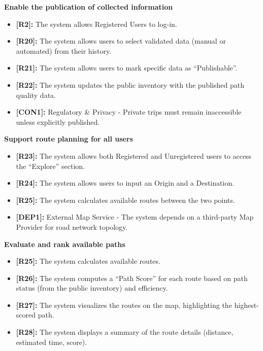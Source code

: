 \begin{enumerate}[label=\textbf{-[G\arabic*]}:]
    \item \textbf{Enable the publication of collected information}
    \begin{itemize}
        \item \textbf{[R2]:} The system allows Registered Users to log-in.
        \item \textbf{[R20]:} The system allows users to select validated data (manual or automated) from their history.
        \item \textbf{[R21]:} The system allows users to mark specific data as ``Publishable''.
        \item \textbf{[R22]:} The system updates the public inventory with the published path quality data.
        \item \textbf{[CON1]:} Regulatory \& Privacy - Private trips must remain inaccessible unless explicitly published.
    \end{itemize}

    \item \textbf{Support route planning for all users}
    \begin{itemize}
        \item \textbf{[R23]:} The system allows both Registered and Unregistered users to access the ``Explore'' section.
        \item \textbf{[R24]:} The system allows users to input an Origin and a Destination.
        \item \textbf{[R25]:} The system calculates available routes between the two points.
        \item \textbf{[DEP1]:} External Map Service - The system depends on a third-party Map Provider for road network topology.
    \end{itemize}

    \item \textbf{Evaluate and rank available paths}
    \begin{itemize}
        \item \textbf{[R25]:} The system calculates available routes.
        \item \textbf{[R26]:} The system computes a ``Path Score'' for each route based on path status (from the public inventory) and efficiency.
        \item \textbf{[R27]:} The system visualizes the routes on the map, highlighting the highest-scored path.
        \item \textbf{[R28]:} The system displays a summary of the route details (distance, estimated time, score).
    \end{itemize}


\end{enumerate}
